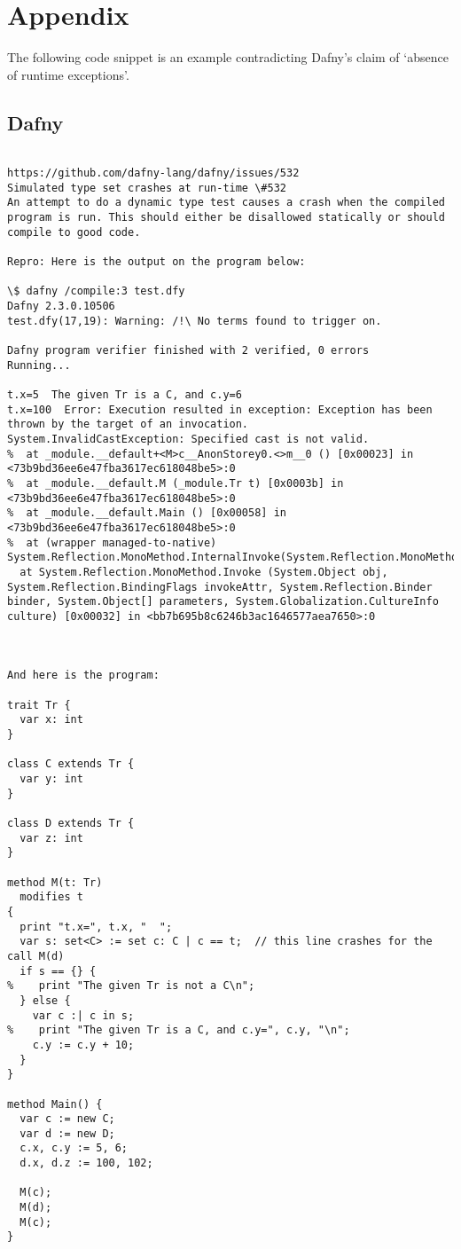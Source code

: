 \documentclass[12pt,openany,a4paper]{book}
\begin{document}
\chapter{Appendix}

The following code snippet is an example contradicting Dafny's claim of `absence of runtime exceptions'.
\section{Dafny}

\label {dafnybug1}

\begin{verbatim}

https://github.com/dafny-lang/dafny/issues/532
Simulated type set crashes at run-time \#532
An attempt to do a dynamic type test causes a crash when the compiled program is run. This should either be disallowed statically or should compile to good code.

Repro: Here is the output on the program below:

\$ dafny /compile:3 test.dfy
Dafny 2.3.0.10506
test.dfy(17,19): Warning: /!\ No terms found to trigger on.

Dafny program verifier finished with 2 verified, 0 errors
Running...

t.x=5  The given Tr is a C, and c.y=6
t.x=100  Error: Execution resulted in exception: Exception has been thrown by the target of an invocation.
System.InvalidCastException: Specified cast is not valid.
%  at _module.__default+<M>c__AnonStorey0.<>m__0 () [0x00023] in <73b9bd36ee6e47fba3617ec618048be5>:0
%  at _module.__default.M (_module.Tr t) [0x0003b] in <73b9bd36ee6e47fba3617ec618048be5>:0
%  at _module.__default.Main () [0x00058] in <73b9bd36ee6e47fba3617ec618048be5>:0
%  at (wrapper managed-to-native) System.Reflection.MonoMethod.InternalInvoke(System.Reflection.MonoMethod,object,object[],System.Exception&)
  at System.Reflection.MonoMethod.Invoke (System.Object obj, System.Reflection.BindingFlags invokeAttr, System.Reflection.Binder binder, System.Object[] parameters, System.Globalization.CultureInfo culture) [0x00032] in <bb7b695b8c6246b3ac1646577aea7650>:0



And here is the program:

trait Tr {
  var x: int
}

class C extends Tr {
  var y: int
}

class D extends Tr {
  var z: int
}

method M(t: Tr)
  modifies t
{
  print "t.x=", t.x, "  ";
  var s: set<C> := set c: C | c == t;  // this line crashes for the call M(d)
  if s == {} {
%    print "The given Tr is not a C\n";
  } else {
    var c :| c in s;
%    print "The given Tr is a C, and c.y=", c.y, "\n";
    c.y := c.y + 10;
  }
}

method Main() {
  var c := new C;
  var d := new D;
  c.x, c.y := 5, 6;
  d.x, d.z := 100, 102;

  M(c);
  M(d);
  M(c);
}

\end{verbatim}
\end{document}
